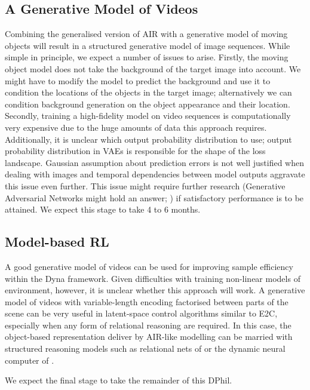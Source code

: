     \subsection{A Generative Model of Videos}
        Combining the generalised version of AIR with a generative model of moving objects will result in a structured generative model of image sequences. While simple in principle, we expect a number of issues to arise. Firstly, the moving object model does not take the background of the target image into account. We might have to modify the model to predict the background and use it to condition the locations of the objects in the target image; alternatively we can condition background generation on the object appearance and their location. 
        Secondly, training a high-fidelity model on video sequences is computationally very expensive due to the huge amounts of data this approach requires.
        Additionally, it is unclear which output probability distribution to use; output probability distribution in VAEs is responsible for the shape of the loss landscape. Gaussian assumption about prediction errors is not well justified when dealing with images and temporal dependencies between model outputs aggravate this issue even further. This issue might require further research (Generative Adversarial Networks might hold an answer; \cite{Wenzhe2016}) if satisfactory performance is to be attained. We expect this stage to take 4 to 6 months.
    
    \subsection{Model-based RL}
        A good generative model of videos can be used for improving sample efficiency within the Dyna framework. Given difficulties with training non-linear models of environment, however, it is unclear whether this approach will work. A generative model of videos with variable-length encoding factorised between parts of the scene can be very useful in latent-space control algorithms similar to E2C, especially when any form of relational reasoning are required. In this case, the object-based representation deliver by AIR-like modelling can be married with structured reasoning models such as relational nets of \cite{Santoro2017} or the dynamic neural computer of \cite{Graves2016}.
        
        
        We expect the final stage to take the remainder of this DPhil.








